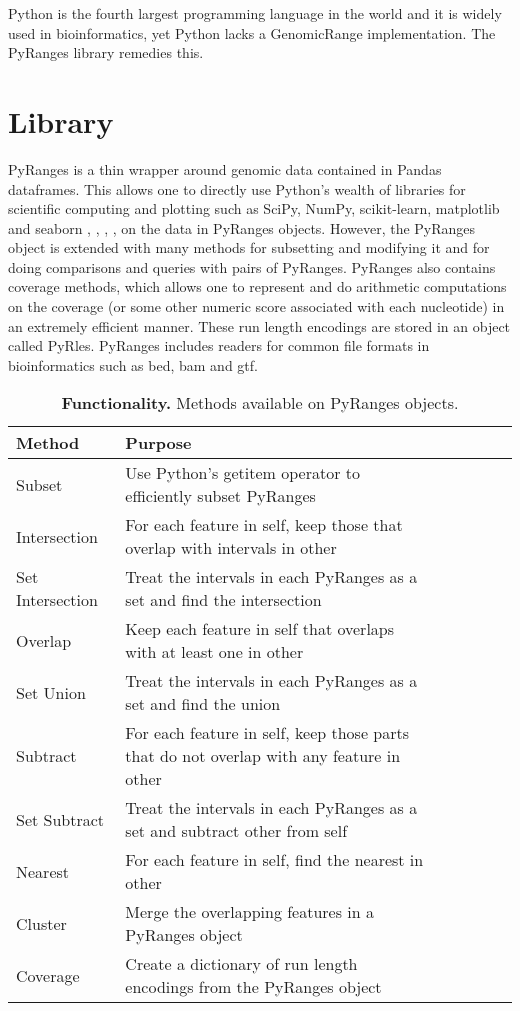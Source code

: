 \documentclass[10pt,letterpaper]{article}
\begin{document}
Python is the fourth largest programming language in the world and it is widely
used in bioinformatics, yet Python lacks a GenomicRange implementation. The
PyRanges library remedies this.

\section*{Library}

PyRanges is a thin wrapper around genomic data contained in Pandas
\cite{mckinney-proc-scipy-2010} dataframes. This allows one to directly use
Python's wealth of libraries for scientific computing and plotting such as
SciPy, NumPy, scikit-learn, matplotlib and seaborn \cite{scipy},
\cite{oliphant-2006-guide}, \cite{scikit-learn}, \cite{Hunter:2007},
\cite{michael_waskom_2017_883859} on the data in PyRanges objects. However, the
PyRanges object is extended with many methods for subsetting and modifying it
and for doing comparisons and queries with pairs of PyRanges. PyRanges also
contains coverage methods, which allows one to represent and do arithmetic
computations on the coverage (or some other numeric score associated with each
nucleotide) in an extremely efficient manner. These run length encodings are
stored in an object called PyRles. PyRanges includes readers for common
file formats in bioinformatics such as bed, bam and gtf.

\begin{table}[!ht]
\begin{adjustwidth}{-1.5in}{0in}
\centering
\caption{{\bf Functionality.} Methods available on PyRanges objects.}
\begin{tabular}{|l|l|l|l|l|l|l|}
\hline
  {\bf Method} & {\bf Purpose} \\ \hline
  Subset & Use Python's getitem operator to efficiently subset PyRanges \\ \hline
  Intersection & For each feature in self, keep those that overlap with intervals in other \footnotemark \\ \hline
  Set Intersection & Treat the intervals in each PyRanges as a set and find the intersection \footnotemark \\ \hline
  Overlap & Keep each feature in self that overlaps with at least one in other \\ \hline
  Set Union & Treat the intervals in each PyRanges as a set and find the union \\ \hline
  Subtract & For each feature in self, keep those parts that do not overlap with any feature in other \\ \hline
  Set Subtract & Treat the intervals in each PyRanges as a set and subtract other from self \\ \hline
  Nearest & For each feature in self, find the nearest in other \\ \hline
  Cluster & Merge the overlapping features in a PyRanges object \\ \hline
  Coverage & Create a dictionary of run length encodings from the PyRanges object \\ \hline
\end{tabular}
\label{tab1}
\end{adjustwidth}
\end{table}
\end{document}
